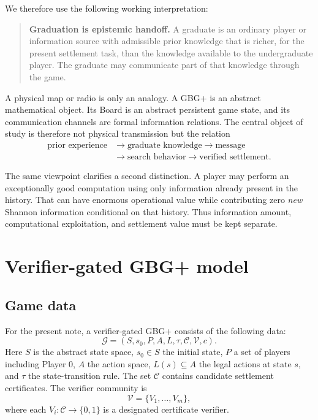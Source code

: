 \documentclass[11pt]{article}
\theoremstyle{definition}
\begin{document}
We therefore use the following working interpretation:
\begin{quote}
\textbf{Graduation is epistemic handoff.}  A graduate is an ordinary player or information source with admissible prior knowledge that is richer, for the present settlement task, than the knowledge available to the undergraduate player.  The graduate may communicate part of that knowledge through the game.
\end{quote}

A physical map or radio is only an analogy.  A GBG+ is an abstract mathematical object.  Its Board is an abstract persistent game state, and its communication channels are formal information relations.  The central object of study is therefore not physical transmission but the relation
\[
\begin{aligned}
\text{prior experience}&\longrightarrow\text{graduate knowledge}\longrightarrow\text{message}\\
&\longrightarrow\text{search behavior}\longrightarrow\text{verified settlement}.
\end{aligned}
\]

The same viewpoint clarifies a second distinction.  A player may perform an exceptionally good computation using only information already present in the history.  That can have enormous operational value while contributing zero \emph{new} Shannon information conditional on that history.  Thus information amount, computational exploitation, and settlement value must be kept separate.

\section{Verifier-gated GBG+ model}

\subsection{Game data}

For the present note, a verifier-gated GBG+ consists of the following data:
\[
\mathcal G=(S,s_0,P,A,L,\tau,\mathcal C,\mathcal V,c).
\]
Here $S$ is the abstract state space, $s_0\in S$ the initial state, $P$ a set of players including Player $0$, $A$ the action space, $L(s)\subseteq A$ the legal actions at state $s$, and $\tau$ the state-transition rule.  The set $\mathcal C$ contains candidate settlement certificates.  The verifier community is
\[
\mathcal V=\{V_1,\ldots,V_m\},
\]
where each $V_i:\mathcal C\to\{0,1\}$ is a designated certificate verifier.
\end{document}
